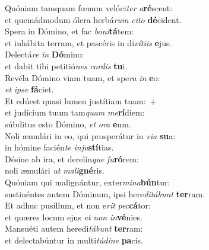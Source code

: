 \evenverse Quóniam tamquam fœnum velóci\textit{ter} \textit{a}\textbf{ré}scent:~\*\\
\evenverse et quemádmodum ólera herbá\textit{rum} \textit{ci}\textit{to} \textbf{dé}cident.\\
\oddverse Spera in Dómino, et fac \textit{bo}\textit{ni}\textbf{tá}tem:~\*\\
\oddverse et inhábita terram, et pascéris in di\textit{ví}\textit{ti}\textit{is} \textbf{e}jus.\\
\evenverse Delectá\textit{re} \textit{in} \textbf{Dó}mino:~\*\\
\evenverse et dabit tibi petitió\textit{nes} \textit{cor}\textit{dis} \textbf{tu}i.\\
\oddverse Revéla Dómino viam tuam, et spe\textit{ra} \textit{in} \textbf{e}o:~\*\\
\oddverse \textit{et} \textit{i}\textit{pse} \textbf{fá}ciet.\\
\evenverse Et edúcet quasi lumen justítiam tuam:~+\\
\evenverse  et judícium tuum tam\textit{quam} \textit{me}\textbf{rí}diem:~\*\\
\evenverse súbditus esto Dómino, \textit{et} \textit{o}\textit{ra} \textbf{e}um.\\
\oddverse Noli æmulári in eo, qui prosperátur in \textit{vi}\textit{a} \textbf{su}a:~\*\\
\oddverse in hómine facién\textit{te} \textit{in}\textit{ju}\textbf{stí}tias.\\
\evenverse Désine ab ira, et derelín\textit{que} \textit{fu}\textbf{ró}rem:~\*\\
\evenverse noli æmulári \textit{ut} \textit{ma}\textit{li}\textbf{gné}ris.\\
\oddverse Quóniam qui malignántur, exter\textit{mi}\textit{na}\textbf{bún}tur:~\*\\
\oddverse sustinéntes autem Dóminum, ipsi here\textit{di}\textit{tá}\textit{bunt} \textbf{ter}ram.\\
\evenverse Et adhuc pusíllum, et non e\textit{rit} \textit{pec}\textbf{cá}tor:~\*\\
\evenverse et quæres locum ejus \textit{et} \textit{non} \textit{in}\textbf{vé}nies.\\
\oddverse Mansuéti autem heredi\textit{tá}\textit{bunt} \textbf{ter}ram:~\*\\
\oddverse et delectabúntur in multi\textit{tú}\textit{di}\textit{ne} \textbf{pa}cis.\\

